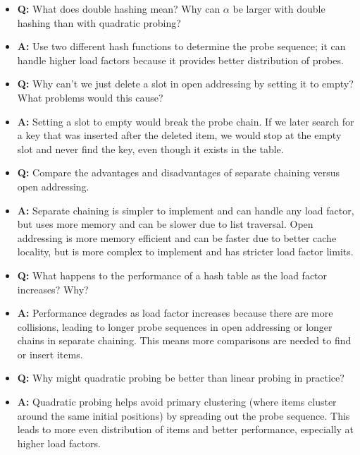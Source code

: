\documentclass[11pt,a4paper]{article}
\begin{document}
\begin{multicols}{2}
\begin{itemize}
    \item \textbf{Q:} What does double hashing mean? Why can $\alpha$ be larger with double hashing than with quadratic probing?
    \item \textbf{A:} Use two different hash functions to determine the probe sequence; it can handle higher load factors because it provides better distribution of probes.

    \item \textbf{Q:} Why can't we just delete a slot in open addressing by setting it to empty? What problems would this cause?
    \item \textbf{A:} Setting a slot to empty would break the probe chain. If we later search for a key that was inserted after the deleted item, we would stop at the empty slot and never find the key, even though it exists in the table.

    \item \textbf{Q:} Compare the advantages and disadvantages of separate chaining versus open addressing.
    \item \textbf{A:} Separate chaining is simpler to implement and can handle any load factor, but uses more memory and can be slower due to list traversal. Open addressing is more memory efficient and can be faster due to better cache locality, but is more complex to implement and has stricter load factor limits.

    \item \textbf{Q:} What happens to the performance of a hash table as the load factor increases? Why?
    \item \textbf{A:} Performance degrades as load factor increases because there are more collisions, leading to longer probe sequences in open addressing or longer chains in separate chaining. This means more comparisons are needed to find or insert items.

    \item \textbf{Q:} Why might quadratic probing be better than linear probing in practice?
    \item \textbf{A:} Quadratic probing helps avoid primary clustering (where items cluster around the same initial positions) by spreading out the probe sequence. This leads to more even distribution of items and better performance, especially at higher load factors.
\end{itemize}


\end{multicols}
\end{document}
